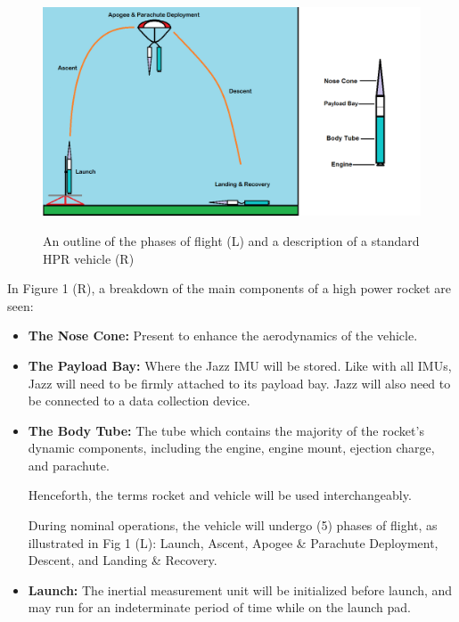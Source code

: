 \documentclass[14pt,a4paper]{article}
\begin{document}
\begin{CenturySchool}
		\begin{figure}[H]
			\includegraphics[width=\linewidth]{associated_files/Con_Ops_Opertions_Combo.png}
			\bfseries\caption{An outline of the phases of flight (L) and a description of a standard HPR vehicle (R)}
			\label{fig:img1)}
		\end{figure}

		
		In Figure 1 (R), a breakdown of the main components of a high power rocket are seen: 
		
		\begin{itemize}
		
		\item{\bfseries The Nose Cone:}  Present to enhance the aerodynamics of the vehicle.
		
		\item{\bfseries The Payload Bay:} Where the Jazz IMU will be stored. Like with all IMUs, Jazz will need to be firmly attached to its payload bay. Jazz will also need to be connected to a data collection device.
		
		\item{\bfseries The Body Tube:} The tube which contains the majority of the rocket’s dynamic components, including the engine, engine mount, ejection charge, and parachute.
		
		Henceforth, the terms rocket and vehicle will be used interchangeably.
		
		During nominal operations, the vehicle will undergo (5) phases of flight, as illustrated in Fig 1 (L): Launch, Ascent, Apogee \& Parachute Deployment, Descent, and Landing \& Recovery.
		
		\item{\bfseries Launch:} The inertial measurement unit will be initialized before launch, and may run for an indeterminate period of time while on the launch pad. 
		

\end{itemize}
\end{CenturySchool}
\end{document}
